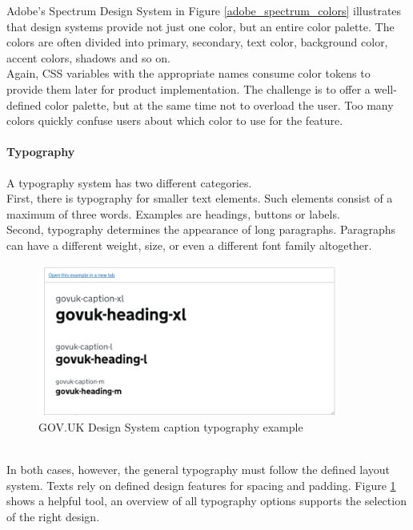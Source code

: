 Adobe's Spectrum Design System in Figure \ref{adobe_spectrum_colors} illustrates that design systems provide not just one color, but an entire color palette. The colors are often divided into primary, secondary, text color, background color, accent colors, shadows and so on. \\
Again, CSS variables with the appropriate names consume color tokens to provide them later for product implementation. The challenge is to offer a well-defined color palette, but at the same time not to overload the user. Too many colors quickly confuse users about which color to use for the feature. \cite{vesselov_building_2019}

\paragraph{Typography}
A typography system has two different categories. \\
First, there is typography for smaller text elements. Such elements consist of a maximum of three words. Examples are headings, buttons or labels. \\
Second, typography determines the appearance of long paragraphs. Paragraphs can have a different weight, size, or even a different font family altogether.
\begin{figure}[hbtp]
	\centerline{\includegraphics[height=5cm]{images/gov_uk_typo.png}}
	\caption{GOV.UK Design System caption typography example \cite{govuk_govuk_nodate}}
	\label{gov_uk_typo}
\end{figure} \\
In both cases, however, the general typography must follow the defined layout system. Texts rely on defined design features for spacing and padding. Figure \ref{gov_uk_typo} shows a helpful tool, an overview of all typography options supports the selection of the right design.  \cite{vesselov_building_2019}


